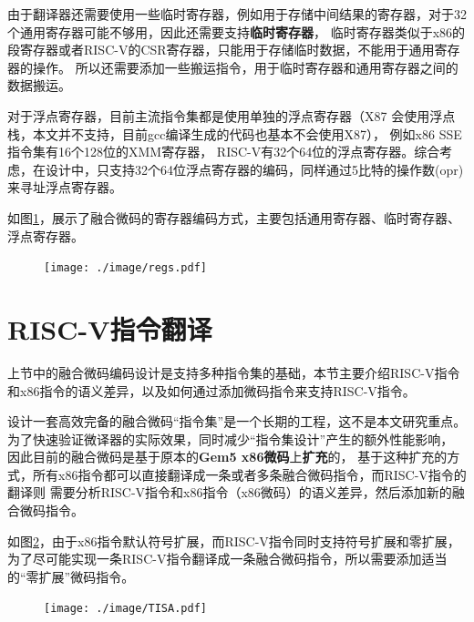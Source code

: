 由于翻译器还需要使用一些临时寄存器，例如用于存储中间结果的寄存器，对于32个通用寄存器可能不够用，因此还需要支持\textbf{临时寄存器}，
临时寄存器类似于x86的段寄存器或者RISC-V的CSR寄存器，只能用于存储临时数据，不能用于通用寄存器的操作。
所以还需要添加一些搬运指令，用于临时寄存器和通用寄存器之间的数据搬运。

对于浮点寄存器，目前主流指令集都是使用单独的浮点寄存器（X87 会使用浮点栈，本文并不支持，目前gcc编译生成的代码也基本不会使用X87），
例如x86 SSE指令集有16个128位的XMM寄存器，
RISC-V有32个64位的浮点寄存器。综合考虑，在设计中，只支持32个64位浮点寄存器的编码，同样通过5比特的操作数(opr)来寻址浮点寄存器。

如图\ref{img:regs}，展示了融合微码的寄存器编码方式，主要包括通用寄存器、临时寄存器、浮点寄存器。

\begin{figure}[h]
  \centering
  \texttt{[image: ./image/regs.pdf]}
  \label{img:regs}
\end{figure}



\section{RISC-V指令翻译}

上节中的融合微码编码设计是支持多种指令集的基础，本节主要介绍RISC-V指令和x86指令的语义差异，以及如何通过添加微码指令来支持RISC-V指令。

设计一套高效完备的融合微码“指令集”是一个长期的工程，这不是本文研究重点。
为了快速验证微译器的实际效果，同时减少“指令集设计”产生的额外性能影响，
因此目前的融合微码是基于原本的\textbf{Gem5 x86微码}上\textbf{扩充}的，
基于这种扩充的方式，所有x86指令都可以直接翻译成一条或者多条融合微码指令，而RISC-V指令的翻译则
需要分析RISC-V指令和x86指令（x86微码）的语义差异，然后添加新的融合微码指令。

如图\ref{img:TISA}，由于x86指令默认符号扩展，而RISC-V指令同时支持符号扩展和零扩展，
为了尽可能实现一条RISC-V指令翻译成一条融合微码指令，所以需要添加适当的“零扩展”微码指令。

\begin{figure}[!htbp]
  \centering
  \texttt{[image: ./image/TISA.pdf]}
  \label{img:TISA}
\end{figure}


